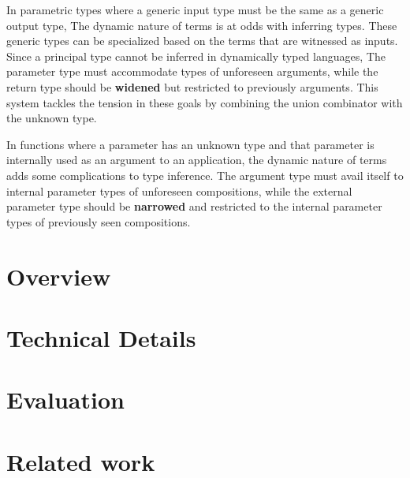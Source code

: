 \documentclass[sigplan,screen]{acmart}
\begin{document}
In parametric types where a generic input type must be the same as a generic output type,
The dynamic nature of terms is at odds with inferring types.
These generic types can be specialized based on the terms that are witnessed as inputs. 
Since a principal type cannot be inferred in dynamically typed languages, 
The parameter type must accommodate types of unforeseen arguments, 
while the return type should be \textbf{widened} but restricted to previously arguments.
This system tackles the tension in these goals by combining the union combinator  
with the unknown type. 

In functions where a parameter has an unknown type and that parameter is 
internally used as an argument to an application, the dynamic nature of terms  
adds some complications to type inference.
The argument type must avail itself to internal parameter types of unforeseen compositions,
while the external parameter type should be \textbf{narrowed} and restricted 
to the internal parameter types of previously seen compositions.




\section{Overview}

\section{Technical Details}

\section{Evaluation}

\section{Related work}





\end{document}
